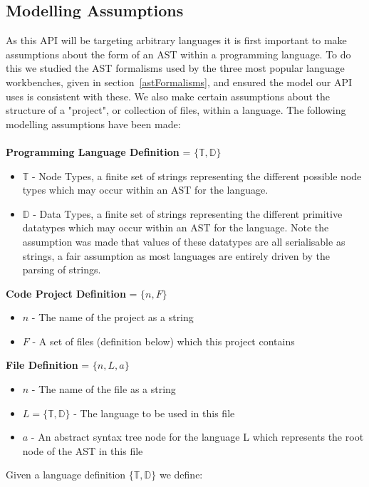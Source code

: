 \documentclass{article}
\begin{document}
\subsection{Modelling Assumptions}\label{apiAssumptions}
As this API will be targeting arbitrary languages it is first important to make assumptions about the form of an AST within a programming language. To do this we studied the AST formalisms used by the three most popular language workbenches, given in section~\ref{astFormalisms}, and ensured the model our API uses is consistent with these. We also make certain assumptions about the structure of a "project", or collection of files, within a language. The following modelling assumptions have been made:
\\
\\
\textbf{Programming Language Definition} = $\{\mathbb{T},\mathbb{D}\}$ 
\begin{itemize}
\item $\mathbb{T}$ - Node Types, a finite set of strings representing the different possible node types which may occur within an AST for the language.
\item $\mathbb{D}$ - Data Types, a finite set of strings representing the different primitive datatypes which may occur within an AST for the language. Note the assumption was made that values of these datatypes are all serialisable as strings, a fair assumption as most languages are entirely driven by the parsing of strings.
\end{itemize}
%
\textbf{Code Project Definition} = $\{n,F \}$ 
\begin{itemize}
\item $n$ - The name of the project as a string
\item $F$ - A set of files (definition below) which this project contains
\end{itemize}
%
\textbf{File Definition} = $\{n, L, a\}$ 
\begin{itemize}
\item $n$ - The name of the file as a string
\item $L=\{\mathbb{T},\mathbb{D}\}$ - The language to be used in this file
\item $a$ - An abstract syntax tree node for the language L which represents the root node of the AST in this file
\end{itemize}
%
Given a language definition $\{\mathbb{T},\mathbb{D}\}$ we define:\\
\\
\end{document}
